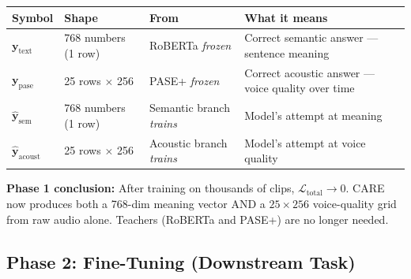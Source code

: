 \documentclass[12pt, a4paper]{article}
\begin{document}
\begin{center}
\end{center}

\bigskip

\begin{center}
\begin{tabular}{llll}
\toprule
\textbf{Symbol} & \textbf{Shape} & \textbf{From} &
\textbf{What it means} \\
\midrule
$\mathbf{y}_\text{text}$ & 768 numbers (1 row) &
  RoBERTa \textit{frozen} &
  Correct semantic answer --- sentence meaning \\[3pt]
$\mathbf{y}_\text{pase}$ & 25 rows $\times$ 256 &
  PASE+ \textit{frozen} &
  Correct acoustic answer --- voice quality over time \\[3pt]
$\hat{\mathbf{y}}_\text{sem}$ & 768 numbers (1 row) &
  Semantic branch \textit{trains} &
  Model's attempt at meaning \\[3pt]
$\hat{\mathbf{y}}_\text{acoust}$ & 25 rows $\times$ 256 &
  Acoustic branch \textit{trains} &
  Model's attempt at voice quality \\
\bottomrule
\end{tabular}
\end{center}

\begin{notebox}
\textbf{Phase 1 conclusion:} After training on thousands of clips,
$\mathcal{L}_\text{total} \to 0$.
CARE now produces both a 768-dim meaning vector AND a
$25\times256$ voice-quality grid from raw audio alone.
Teachers (RoBERTa and PASE+) are no longer needed.
\end{notebox}

\subsection{Phase 2: Fine-Tuning (Downstream Task)}
\end{document}
